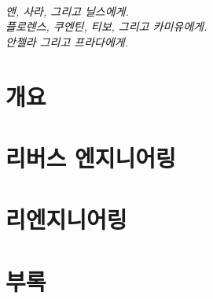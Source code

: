 \documentclass[a4paper,10pt,twoside]{book}
\begin{document}
\vfill
\newpage
~\vfill
\begin{center}
\emph{앤, 사라, 그리고 닐스에게.\\
플로렌스, 쿠엔틴, 티보, 그리고 카미유에게.\\
안젤라 그리고 프라다에게.}
\end{center}
\vfill
\cleardoublepage

\tableofcontents
\sloppy %

\mainmatter
\part{개요}

\part{리버스 엔지니어링}




\part{리엔지니어링}





\appendix
\part{부록}



{\small\raggedright\printindex}
\markboth{}{}
\pagestyle{empty}
\cleardoublepage
~ %
\cleardoublepage
~ %
\cleardoublepage
\end{document}
